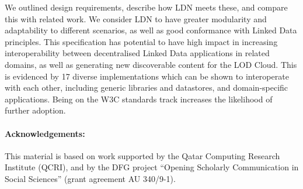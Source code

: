 \documentclass[a4paper]{llncs}
\begin{document}
\par We outlined design requirements, describe how LDN meets these, and compare this with related work. We consider LDN to have greater modularity and adaptability to different scenarios, as well as good conformance with Linked Data principles. This specification has potential to have high impact in increasing interoperability between decentralised Linked Data applications in related domains, as well as generating new discoverable content for the LOD Cloud. This is evidenced by 17 diverse implementations which can be shown to interoperate with each other, including generic libraries and datastores, and domain-specific applications. Being on the W3C standards track increases the likelihood of further adoption.


\paragraph{Acknowledgements:}
This material is based on work supported by the Qatar Computing Research Institute (QCRI), and by the DFG project “Opening Scholarly Communication in Social Sciences” (grant agreement AU 340/9-1).
\end{document}
